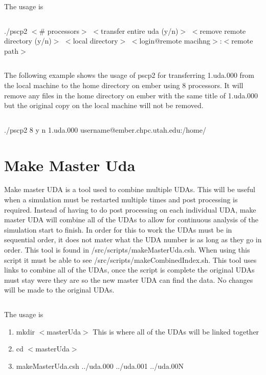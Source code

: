 $\ $

The usage is 

$\ $

 ./pscp2 $<$$\#$ processors$>$ $<$transfer entire uda (y/n)$>$ $<$remove remote directory (y/n)$>$ $<$local directory$>$ $<$login@remote macihng$>$:$<$remote path$>$
 
$\ $
 
 The following example shows the usage of pscp2 for transferring 1.uda.000 from the local machine to the home directory on ember using 8 processors. It will remove any files in the home directory on ember with the same title of 1.uda.000 but the original copy on the local machine will not be removed.
 
$\ $
 
 ./pscp2 8 y n 1.uda.000 username@ember.chpc.utah.edu:/home/

\section{Make Master Uda}
Make master UDA is a tool used to combine multiple UDAs. This will be useful when a simulation must be restarted multiple times and post processing is required. Instead of having to do post processing on each individual UDA, make master UDA will combine all of the UDAs to allow for continuous analysis of the simulation start to finish. In order for this to work the UDAs must be in sequential order, it does not mater what the UDA number is as long as they go in order.  This tool is found in /src/scripts/makeMasterUda.csh. When using this script it must be able to see /src/scripts/makeCombinedIndex.sh. This tool uses links to combine all of the UDAs, once the script is complete the original UDAs must stay were they are so the new master UDA can find the data. No changes will be made to the original UDAs.

$\ $

The usage is 
\begin{enumerate}
\item mkdir $<$masterUda$>$ This is where all of the UDAs will be linked together
\item cd $<$masterUda$>$
\item makeMasterUda.csh ../uda.000 ../uda.001 ../uda.00N


\end{enumerate}

